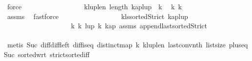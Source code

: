 \begin{isabellebody}
\ force\isanewline
\ \ \ \ \ \ \ \ \ \ \ \ \ \ \ \ \isamarkupfalse%
\ k{\isacharunderscore}{\kern0pt}lup{\isacharunderscore}{\kern0pt}len{\isacharcolon}{\kern0pt}\ {\isachardoublequoteopen}length\ {\isacharparenleft}{\kern0pt}kap{\isacharat}{\kern0pt}{\isacharbrackleft}{\kern0pt}lup{\isacharbang}{\kern0pt}{}{\isacharbrackright}{\kern0pt}{\isacharparenright}{\kern0pt}\ {\isacharequal}{\kern0pt}\ k{\isachardoublequoteclose}\ \isamarkupfalse%
\ k{}\ k{}\isanewline
\ \ \ \ \ \ \ \ \ \ \ \ \ \ \ \ \ \ \isamarkupfalse%
\ assms{\isacharparenleft}{\kern0pt}{}{\isacharparenright}{\kern0pt}\ \isamarkupfalse%
\ fastforce\isanewline
\ \ \ \ \ \ \ \ \ \ \ \ \ \ \ \ \isamarkupfalse%
\ kl{\isacharunderscore}{\kern0pt}s{\isacharcolon}{\kern0pt}{\isachardoublequoteopen}sortedStrict\ {\isacharparenleft}{\kern0pt}kap{\isacharat}{\kern0pt}{\isacharbrackleft}{\kern0pt}lup{\isacharbang}{\kern0pt}{}{\isacharbrackright}{\kern0pt}{\isacharparenright}{\kern0pt}{\isachardoublequoteclose}\isanewline
\ \ \ \ \ \ \ \ \ \ \ \ \ \ \ \ \ \ \isamarkupfalse%
\ k{}\ k{}\ lup{\isacharparenleft}{\kern0pt}{}{\isacharparenright}{\kern0pt}\ k{}\ kap{\isacharparenleft}{\kern0pt}{}{\isacharparenright}{\kern0pt}\ assms\ append{\isacharunderscore}{\kern0pt}last{\isacharunderscore}{\kern0pt}sortedStrict\isanewline
\ \ \ \ \ \ \ \ \ \ \ \ \ \ \ \ \ \ \isamarkupfalse%
\ {\isacharparenleft}{\kern0pt}metis\ Suc{\isacharunderscore}{\kern0pt}{}\ diff{\isacharunderscore}{\kern0pt}diff{\isacharunderscore}{\kern0pt}left\ diff{\isacharunderscore}{\kern0pt}is{\isacharunderscore}{\kern0pt}{}{\isacharunderscore}{\kern0pt}eq\ distinct{\isacharunderscore}{\kern0pt}map\ k{}{\isacharparenleft}{\kern0pt}{}{\isacharparenright}{\kern0pt}\ k{\isacharunderscore}{\kern0pt}lup{\isacharunderscore}{\kern0pt}len\ last{\isacharunderscore}{\kern0pt}conv{\isacharunderscore}{\kern0pt}nth\ list{\isachardot}{\kern0pt}size{\isacharparenleft}{\kern0pt}{}{\isacharparenright}{\kern0pt}\ plus{\isacharunderscore}{\kern0pt}{}{\isacharunderscore}{\kern0pt}eq{\isacharunderscore}{\kern0pt}Suc\ sorted{\isacharunderscore}{\kern0pt}wrt{}{}\ strict{\isacharunderscore}{\kern0pt}sorted{\isacharunderscore}{\kern0pt}iff{\isacharparenright}{\kern0pt}\isanewline
\ \ \ \ \ \ \ \ \ \ \ \ \ \ \ \ \isamarkupfalse%

\end{isabellebody}
